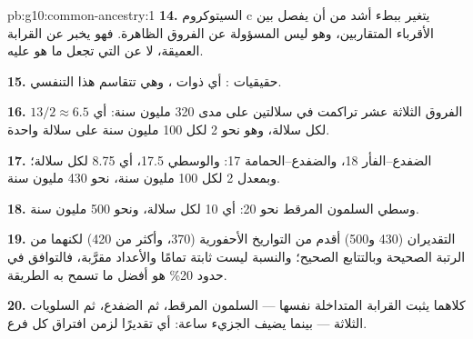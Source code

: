 \begin{solution}{pb:g10:common-ancestry:1}
\textbf{14.} السيتوكروم c يتغير ببطء أشد من أن يفصل بين الأقرباء
المتقاربين، وهو ليس  المسؤولة عن الفروق الظاهرة. فهو يخبر عن
القرابة العميقة، لا عن  التي تجعل  ما هو عليه.

\textbf{15.} حقيقيات : أي  ذوات  ، وهي
تتقاسم هذا  التنفسي.

\textbf{16.} الفروق الثلاثة عشر تراكمت في سلالتين على مدى 320 مليون
سنة: أي $13/2 \approx 6.5$ لكل سلالة، وهو نحو 2 لكل 100 مليون سنة على
سلالة واحدة.

\textbf{17.} الضفدع--الفأر 18، والضفدع--الحمامة 17: والوسطي 17.5، أي
8.75 لكل سلالة؛ وبمعدل 2 لكل 100 مليون سنة، نحو 430 مليون سنة.

\textbf{18.} وسطي السلمون المرقط نحو 20: أي 10 لكل سلالة، ونحو 500
مليون سنة.

\textbf{19.} التقديران (430 و500) أقدم من التواريخ الأحفورية (370،
وأكثر من 420) لكنهما من الرتبة الصحيحة وبالتتابع الصحيح؛ والنسبة ليست
ثابتة تمامًا والأعداد مقرَّبة، فالتوافق في حدود 20\% هو أفضل ما تسمح
به الطريقة.

\textbf{20.} كلاهما يثبت القرابة المتداخلة نفسها --- السلمون المرقط،
ثم الضفدع، ثم السلويات الثلاثة --- بينما يضيف الجزيء ساعة: أي تقديرًا
لزمن افتراق كل فرع.
\end{solution}
